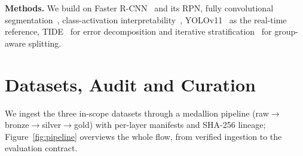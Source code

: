 \documentclass[conference]{IEEEtran}
\begin{document}
\textbf{Methods.} We build on Faster R-CNN~\cite{fasterrcnn} and its RPN, fully
convolutional segmentation~\cite{fcn}, class-activation
interpretability~\cite{cam,gradcam,guidedbp}, YOLOv11~\cite{yolo11} as the
real-time reference, TIDE~\cite{tide} for error decomposition and iterative
stratification~\cite{sechidis} for group-aware splitting.

\section{Datasets, Audit and Curation}
\label{sec:data}

We ingest the three in-scope datasets through a medallion pipeline
(raw$\rightarrow$bronze$\rightarrow$silver$\rightarrow$gold) with per-layer
manifests and SHA-256 lineage; Figure~\ref{fig:pipeline} overviews the whole
flow, from verified ingestion to the evaluation contract.
\end{document}
